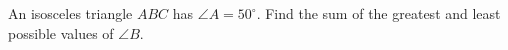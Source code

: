 An isosceles triangle $ABC$ has $\angle A=50^\circ$. Find the sum of the greatest and least possible values of $\angle B$.
